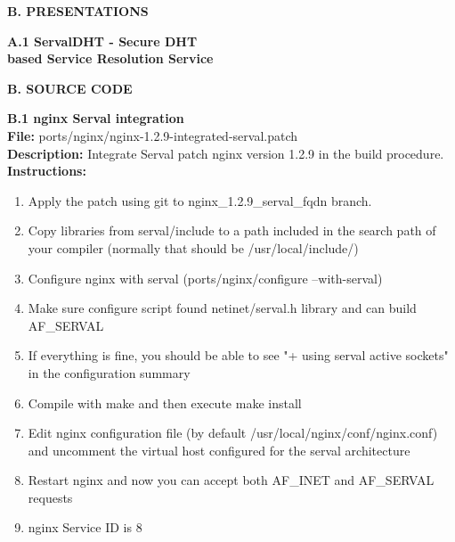 \newpage
{}
{}
\label{sec:sourcecode}
{\Huge \bf \noindent B. PRESENTATIONS}

\newpage
{}
{}
\label{sec:servaldhtpres}
{\huge \bf \noindent A.1 ServalDHT - Secure DHT\\[0.2cm] based Service Resolution Service}



\newpage
{}
{}
\label{sec:sourcecode}
{\Huge \bf \noindent B. SOURCE CODE}


\newpage
{}
{}
\label{sec:nginxport}
{\huge \bf \noindent B.1 nginx Serval integration}\\[0.5cm]
\textbf{File:} ports/nginx/nginx-1.2.9-integrated-serval.patch\\
\textbf{Description:} Integrate Serval patch nginx version 1.2.9 in the build procedure.\\
\textbf{Instructions: }
\begin{enumerate} \itemsep1pt \parskip0pt 
	\item Apply the patch using git to nginx\_1.2.9\_serval\_fqdn branch.
	\item Copy libraries from serval/include to a path included in the search path of your compiler (normally that should be /usr/local/include/)
	\item Configure nginx with serval (ports/nginx/configure --with-serval)
	\item Make sure configure script found netinet/serval.h library and can build AF\_SERVAL
	\item If everything is fine, you should be able to see "+ using serval active sockets" in the configuration summary
	\item Compile with make and then execute make install
	\item Edit nginx configuration file (by default /usr/local/nginx/conf/nginx.conf) and uncomment the virtual host configured for the serval architecture
	\item Restart nginx and now you can accept both AF\_INET and AF\_SERVAL requests
	\item nginx Service ID is 8\\[0.5cm]
\end{enumerate}


